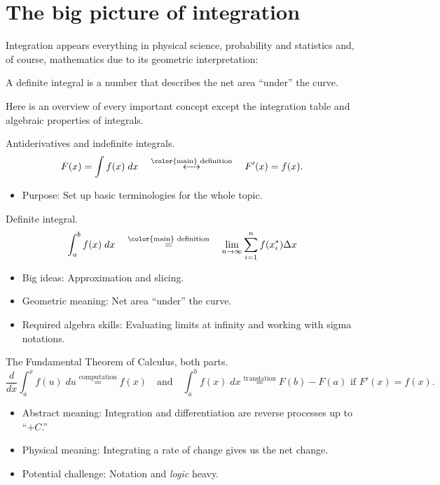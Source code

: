 \documentclass[../main.tex]{subfiles}
\begin{document}
 \section{The big picture of integration}
Integration appears everything in physical science, probability and statistics and, of course, mathematics due to its geometric interpretation:

\medskip
\begin{mdframed}[style=simple]
  \centering
  \color{main}
  A definite integral is a number that describes the net area ``under'' the curve.
\end{mdframed}

Here is an overview of every important concept except the integration table and algebraic properties of integrals.
\begin{description}[itemsep=2ex]
  \item[Terminologies.] Antiderivatives and indefinite integrals.
    \[
      F(x) = \int f(x) \;dx \quad\overset{\text{\color{main} definition}}{\longleftrightarrow}\quad F'(x) = f(x).
    \]        
    \begin{itemize}
      \item Purpose: Set up basic terminologies for the whole topic.
    \end{itemize}

  \item[Concept.] Definite integral.
    \[
      \int_{a}^{b} f(x) \; dx \quad\overset{\text{\color{main} definition}}{=}\quad \lim_{n \to \infty} \sum_{i=1}^{n} f(x_{i}^{*}) {\Delta x}
    \]

    \begin{itemize}
      \item Big ideas: Approximation and slicing.
      \item Geometric meaning: Net area ``under'' the curve.
      \item Required algebra skills: Evaluating limits at infinity and working with sigma notations.
    \end{itemize}

  \item[Theorem.] The Fundamental Theorem of Calculus, both parts. 
    \[
      \frac{d}{dx} \int_{a}^{x} f(u) \;du \overset{\text{computation}}{=} f(x) \quad\text{and}\quad \int_{a}^{b} f(x) \;dx \overset{\text{translation}}{=} F(b) - F(a) \text{ if } F'(x) = f(x).
    \]
    \begin{itemize}
      \item Abstract meaning: Integration and differentiation are reverse processes up to ``\(+C\).''
      \item Physical meaning: Integrating a rate of change gives us the net change.
      \item Potential challenge: Notation and \emph{logic} heavy.
    \end{itemize}


\end{description}
\end{document}
